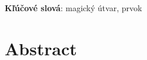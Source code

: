 \documentclass[12pt, twoside]{book}
\begin{document}
\textbf{Kľúčové slová}: magický útvar, prvok



\newpage 
\section*{Abstract}


%
%



\newpage 

\tableofcontents



\newpage 



\mainmatter


 













\newpage	

\backmatter

\thispagestyle{empty}
\clearpage


% 
\end{document}
